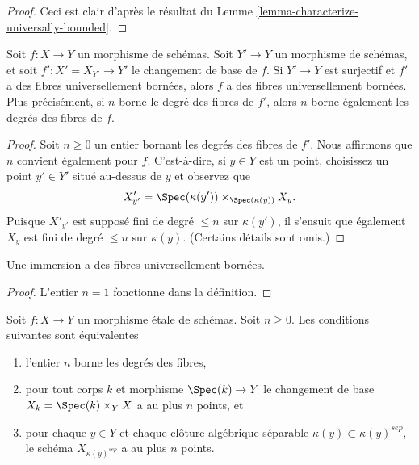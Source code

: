\begin{proof}
Ceci est clair d'après
le résultat du Lemme \ref{lemma-characterize-universally-bounded}.
\end{proof}

\begin{lemma}
\label{lemma-descent-universally-bounded}
Soit $f : X \to Y$ un morphisme de schémas. Soit $Y' \to Y$
un morphisme de schémas, et soit $f' : X' = X_{Y'} \to Y'$ le
changement de base de $f$. Si $Y' \to Y$ est surjectif
et $f'$ a des fibres universellement bornées, alors $f$ a des
fibres universellement bornées. Plus précisément, si $n$ borne le degré
des fibres de $f'$, alors $n$ borne également les degrés des
fibres de $f$.
\end{lemma}

\begin{proof}
Soit $n \geq 0$ un entier bornant les degrés des fibres de $f'$. Nous affirmons que
$n$ convient également pour $f$. C’est-à-dire, si $y \in Y$ est un point,
choisissez un point $y' \in Y'$ situé au-dessus de $y$ et observez que
$$
X'_{y'} = \Spec(\kappa(y')) \times_{\Spec(\kappa(y))} X_y.
$$
Puisque $X'_{y'}$ est supposé fini de degré $\leq n$ sur $\kappa(y')$, il s'ensuit
que également $X_y$ est fini de degré $\leq n$ sur $\kappa(y)$. (Certains
détails sont omis.)
\end{proof}

\begin{lemma}
\label{lemma-immersion-universally-bounded}
Une immersion a des fibres universellement bornées.
\end{lemma}

\begin{proof}
L'entier $n = 1$ fonctionne dans la définition.
\end{proof}

\begin{lemma}
\label{lemma-etale-universally-bounded}
Soit $f : X \to Y$ un morphisme étale de schémas. Soit $n \geq 0$.
Les conditions suivantes sont équivalentes
\begin{enumerate}
\item l'entier $n$ borne les degrés des fibres,
\item pour tout corps $k$ et morphisme $\Spec(k) \to Y$ le
changement de base $X_k = \Spec(k) \times_Y X$ a au plus $n$ points, et
\item pour chaque $y \in Y$ et chaque clôture algébrique
séparable $\kappa(y) \subset \kappa(y)^{sep}$, le schéma $X_{\kappa(y)^{sep}}$
a au plus $n$ points.
\end{enumerate}
\end{lemma}

